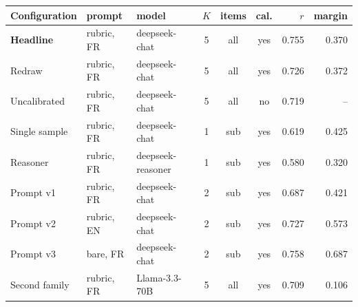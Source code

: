 \setlength{\tabcolsep}{3pt}
\begin{tabular}{lllcccrr}
\toprule
Configuration & prompt & model & $K$ & items & cal. & $r$ & margin \\
\midrule
\textbf{Headline} & rubric, FR & deepseek-chat & 5 & all & yes & 0.755 & 0.370 \\
Redraw & rubric, FR & deepseek-chat & 5 & all & yes & 0.726 & 0.372 \\
Uncalibrated & rubric, FR & deepseek-chat & 5 & all & no & 0.719 & -- \\
Single sample & rubric, FR & deepseek-chat & 1 & sub & yes & 0.619 & 0.425 \\
Reasoner & rubric, FR & deepseek-reasoner & 1 & sub & yes & 0.580 & 0.320 \\
Prompt v1 & rubric, FR & deepseek-chat & 2 & sub & yes & 0.687 & 0.421 \\
Prompt v2 & rubric, EN & deepseek-chat & 2 & sub & yes & 0.727 & 0.573 \\
Prompt v3 & bare, FR & deepseek-chat & 2 & sub & yes & 0.758 & 0.687 \\
Second family & rubric, FR & Llama-3.3-70B & 5 & all & yes & 0.709 & 0.106 \\
\bottomrule
\end{tabular}
